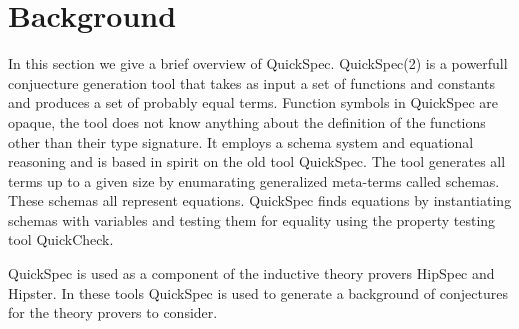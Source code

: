 \section{Background}
In this section we give a brief overview of
QuickSpec.
QuickSpec(2) is a powerfull conjuecture generation
tool that takes as input a set of functions and constants
and produces a set of probably equal terms.
Function symbols in QuickSpec are opaque, the tool
does not know anything about the definition of
the functions other than their type signature.
It employs a schema system and equational reasoning
and is based in spirit on the old
tool QuickSpec\cite{Claessen2010}.
The tool generates all terms up to a given
size by enumarating generalized meta-terms called
schemas. These schemas all represent
equations. QuickSpec finds equations by instantiating
schemas with variables and testing them for equality
using the property testing tool QuickCheck\cite{Claessen2000}.

QuickSpec is used as a component of the inductive
theory provers HipSpec\cite{Claessen2013} and Hipster\cite{Johansson2014}.
In these tools QuickSpec is used to generate
a background of conjectures for the theory provers
to consider.
